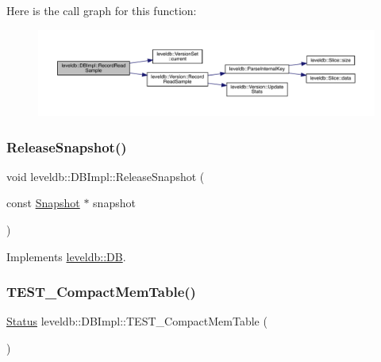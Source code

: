 Here is the call graph for this function\+:
\nopagebreak
\begin{figure}[H]
\begin{center}
\leavevmode
\includegraphics[width=350pt]{classleveldb_1_1_d_b_impl_a254ae98e3425046c28ed0aa6d78b37d8_cgraph}
\end{center}
\end{figure}
\mbox{\label{classleveldb_1_1_d_b_impl_a6c0b6abfc9a30cc8e5412d4fc3e8c886}} 
\subsubsection{\texorpdfstring{ReleaseSnapshot()}{ReleaseSnapshot()}}
{\footnotesize\ttfamily void leveldb\+::\+D\+B\+Impl\+::\+Release\+Snapshot (\begin{DoxyParamCaption}\item[{const \mbox{\hyperlink{classleveldb_1_1_snapshot}{Snapshot}} $\ast$}]{snapshot }\end{DoxyParamCaption})\hspace{0.3cm}{\ttfamily [virtual]}}



Implements \mbox{\hyperlink{classleveldb_1_1_d_b_aa46de65e990bd179db0aee770af89144}{leveldb\+::\+DB}}.

\mbox{\label{classleveldb_1_1_d_b_impl_a8642703fd1398cd8e3f5f24ee0b9da23}} 
\subsubsection{\texorpdfstring{TEST\_CompactMemTable()}{TEST\_CompactMemTable()}}
{\footnotesize\ttfamily \mbox{\hyperlink{classleveldb_1_1_status}{Status}} leveldb\+::\+D\+B\+Impl\+::\+T\+E\+S\+T\+\_\+\+Compact\+Mem\+Table (\begin{DoxyParamCaption}{ }\end{DoxyParamCaption})}

